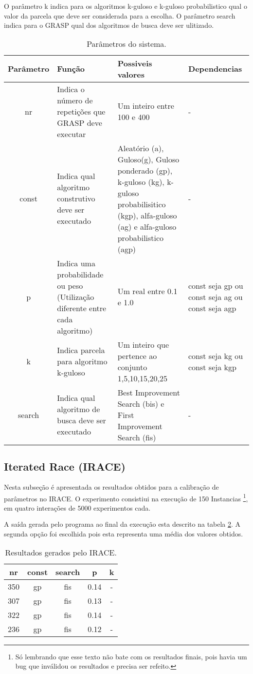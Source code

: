 \documentclass[12pt]{article}
\begin{document}
O parâmetro k indica para os algoritmos k-guloso e k-guloso probabilistico qual o valor da parcela que deve ser considerada para a escolha. O parâmetro search indica para o GRASP qual dos algoritmos de busca deve ser ulitizado.

\begin{table}[t]
	\centering
	\begin{tabular}{| c | p{3.5cm} | p{3.5cm} | p{3.5cm} | }
		\hline
		Parâmetro&Função&Possiveis valores&Dependencias\\ \hline
		nr&Indica o número de repetições que GRASP deve executar&Um inteiro entre 100 e 400&-\\ \hline
		const&Indica qual algoritmo construtivo deve ser executado&Aleatório (a), Guloso(g), Guloso ponderado (gp), k-guloso (kg), k-guloso probabilisitico (kgp), alfa-guloso (ag) e alfa-guloso probabilistico (agp)&-\\ \hline
		p&Indica uma probabilidade ou peso (Utilização diferente entre cada algoritmo)&Um real entre 0.1 e 1.0&const seja gp ou const seja ag ou const seja agp\\ \hline
		k&Indica parcela para algoritmo k-guloso&Um inteiro que pertence ao conjunto {1,5,10,15,20,25}&const seja kg ou const seja kgp\\ \hline
		search&Indica qual algoritmo de busca deve ser executado& Best Improvement Search (bis) e First Improvement Search (fis)&-\\ \hline
	\end{tabular}
	\caption{Parâmetros do sistema.}
	\label{tabela_parametros}
\end{table}


\subsection{Iterated Race (IRACE)}
Nesta subseção é apresentada os resultados obtidos para a calibração de parâmetros no IRACE. O experimento consistiui na execução de 150 Instancias \footnote{Só lembrando que esse texto não bate com os resultados finais, pois havia um bug que inválidou os resultados e precisa ser refeito.}, em quatro interações de 5000 experimentos cada.

A saída gerada pelo programa ao final da execução esta descrito na tabela \ref{tabela_resultado_irace}. A segunda opção foi escolhida pois esta representa uma média dos valores obtidos.

\begin{table}[t]
	\centering
	\begin{tabular}{| c | c | c | c | c |}
		\hline
		nr&const&search&p&k\\ \hline
		350&gp&fis&0.14&-\\ \hline
		307&gp&fis&0.13&-\\ \hline
		322&gp&fis&0.14&-\\ \hline
		236&gp&fis&0.12&-\\ \hline
	\end{tabular}
	\caption{Resultados gerados pelo IRACE.}
	\label{tabela_resultado_irace}
\end{table}
\end{document}
